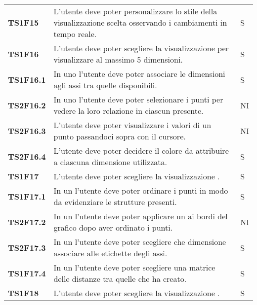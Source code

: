 {\begin{longtable}{ C{2cm} | C{12cm}| C{1.5cm} }
\textbf{TS1F15} & 
L'utente deve poter personalizzare lo stile della visualizzazione scelta osservando i cambiamenti in tempo reale. & 
S\\

\textbf{TS1F16} & 
L'utente deve poter scegliere la visualizzazione  per visualizzare  al massimo 5 dimensioni. & 
S\\

\textbf{TS1F16.1} & 
In uno  l'utente deve poter associare le dimensioni agli assi tra quelle disponibili. & 
S\\

\textbf{TS2F16.2} & 
In uno  l'utente deve poter selezionare i punti per vedere la loro relazione in ciascun  presente. & 
NI\\

\textbf{TS2F16.3} & 
L'utente deve poter visualizzare i valori di un punto passandoci sopra con il cursore. & 
NI\\

\textbf{TS2F16.4} & 
L'utente deve poter decidere il colore da attribuire a ciascuna dimensione utilizzata. & 
S\\

\textbf{TS1F17} & 
L'utente deve poter scegliere la visualizzazione . & 
S\\

\textbf{TS1F17.1} & 
In un  l'utente deve poter ordinare i punti in modo da evidenziare le strutture presenti. & 
S\\

\textbf{TS2F17.2} & 
In un  l'utente deve poter applicare un  ai bordi del grafico dopo aver ordinato i punti. & 
NI\\

\textbf{TS2F17.3} & 
In un  l'utente deve poter scegliere che dimensione associare alle etichette degli assi. & 
S\\

\textbf{TS1F17.4} & 
In un  l'utente deve poter scegliere una matrice delle distanze tra quelle che ha creato. & 
S\\

\textbf{TS1F18} & 
L'utente deve poter scegliere la visualizzazione . & 
S\\


\end{longtable}}

